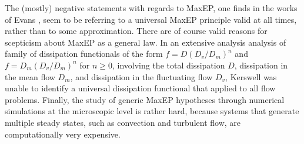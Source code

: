 \documentclass[a4paper,12pt]{article}
\begin{document}


The (mostly) negative statements with regards to MaxEP, one finds in the works of Evans \cite{Evans:2241458}, seem to be referring to a universal MaxEP principle valid at all times, rather than to some approximation.
There are of course valid reasons for scepticism about MaxEP as a general law. In an extensive analysis analysis of family of dissipation functionals of the form $f= D(D_v/D_m)^n$ and $f= D_m(D_v/D_m)^n$ for $n\geq 0$, involving the total dissipation $D$, dissipation in the mean flow $D_m$, and dissipation in the fluctuating flow $D_v$, Kerswell \cite{Kerswell:2002bw} was unable to identify a universal dissipation functional that applied to all flow problems.
Finally, the study of generic MaxEP hypotheses through numerical simulations at the microscopic level is rather hard, because systems that generate multiple steady states, such as convection and turbulent flow, are computationally very expensive.
 
\end{document}
